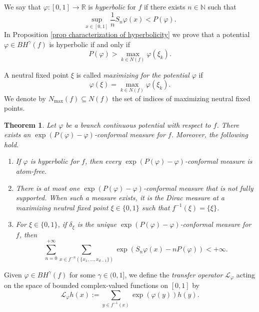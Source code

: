 \documentclass[12pt]{amsart}
\numberwithin{equation}{section} %
\numberwithin{figure}{section} %
\theoremstyle{plain}
\newtheorem{theoalph}{Theorem}
\theoremstyle{definition}
\theoremstyle{remark}
\theoremstyle{citing}
\newcommand{\N}{\mathbb{N}}
\newcommand{\R}{\mathbb{R}}
\renewcommand{\=}{\coloneqq}
\newcommand{\Nmax}{N_\text{max}(f)}
\begin{document}
We say that $\varphi\colon[0,1]\to\R$ is \emph{hyperbolic} for $f$ if there exists $n\in \N$ such that
\begin{equation}\label{equation hyperbolicity introduction}
    \sup_{x\in[0,1]}\frac{1}{n}S_n\varphi(x) < P(\varphi).
\end{equation}
In Proposition \ref{prop characterization of hyperbolicity} we prove that a potential $\varphi\in BH^{\gamma}(f)$ is hyperbolic if and only if
\begin{equation}\label{eq equivalence of hyperbolicity}
    P(\varphi)> \max_{k\in N(f)}\varphi(\xi_k).
\end{equation}

A neutral fixed point $\xi$ is called \emph{maximizing for the potential $\varphi$} if
\begin{equation}
    \varphi(\xi) = \max_{k\in N(f)}\varphi(\xi_k).
\end{equation}
We denote by $\Nmax\subseteq N(f)$ the set of indices of maximizing neutral fixed points.

\begin{theoalph}\label{t: conformal measure}
Let $\varphi$ be a branch continuous potential with respect to $f$. There exists an $\exp(P(\varphi)-\varphi)$-conformal measure for $f$. Moreover, the following hold.
\begin{enumerate}
    \item[1.] If $\varphi$ is hyperbolic for $f$, then every  $\exp(P(\varphi)-\varphi)$-conformal measure is atom-free.
    \item[2.] There is at most one $\exp(P(\varphi)-\varphi)$-conformal measure that is not fully supported. When such a measure exists, it is the Dirac measure at a maximizing neutral fixed point $\xi\in\{0,1\}$ such that $f^{-1}(\xi)=\{\xi\}$.
    \item[3.] For $\xi\in\{0,1\}$, if $\delta_\xi$ is the unique  $\exp(P(\varphi)- \varphi)$-conformal measure for $f$, then
    \begin{equation}\label{e: eq 1 thm A}
        \sum_{n=0}^{+\infty}\sum_{x\in f^{-n}(\{x_1,\dots,x_{d-1}\})}\exp(S_n\varphi(x)- nP(\varphi))<+\infty.
    \end{equation}
\end{enumerate}
\end{theoalph}

Given $\varphi\in BH^{\gamma}(f)$ for some $\gamma\in(0,1]$, we define the \emph{transfer operator} $\mathcal{L}_{\varphi}$ acting on the space of bounded complex-valued functions on $[0,1]$ by
\begin{equation}\label{eq transfer operator 3}
    \mathcal{L}_{\varphi}h (x) := \sum_{y\in f^{-1}(x)}\exp(\varphi(y))h(y).
\end{equation}
\end{document}
